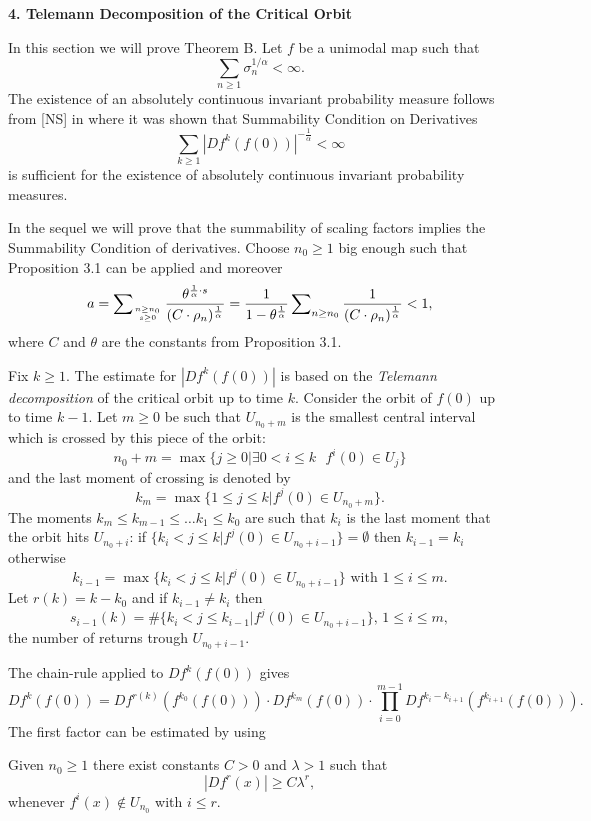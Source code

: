 \bigskip
\centerline{\bf 4. Telemann Decomposition of the Critical Orbit}
\bigskip

\flushpar
In this section we will prove Theorem B. Let $f$ be a unimodal
map such that 
$$
\sum_{n\ge 1} \sigma_n^{1/\alpha}<\infty.
$$
The existence of an absolutely continuous invariant probability
measure follows from [NS] in where it was shown that  Summability 
Condition on Derivatives
$$
\sum_{k\ge 1}|Df^k(f(0))|^{-\frac1\alpha}<\infty
$$
is 
sufficient for the existence of absolutely continuous invariant 
probability measures.

\flushpar
In the sequel we will prove that the summability of scaling factors
implies the Summability Condition of derivatives. 
Choose $n_0\ge 1$ big enough such that Proposition 3.1 can be applied
and moreover
$$
a=\sum_{{n\ge n_0} \atop {s\ge 0}}\frac{\theta^{\frac1\alpha\cdot s}}
                                     {(C\cdot\rho_n)^{\frac{1}{\alpha}}}= 
\frac{1}{1-\theta^{\frac1\alpha}} \sum_{n\ge n_0} 
\frac{1}{(C\cdot \rho_n)^\frac1\alpha}< 1,
$$
where $C$ and $\theta$ are the constants from Proposition 3.1.

\flushpar
Fix $k\ge 1$. The estimate for $|Df^k(f(0))|$ is based on the {\it Telemann 
decomposition} of the critical orbit up to time $k$. Consider the 
orbit of $f(0)$ up to time $k-1$. Let $m\ge 0$
be such that $U_{n_0+m}$ is the smallest central interval
which is crossed by this piece of the orbit:
$$
n_0+m=\max\{j\ge 0| \exists 0<i\le k \text{  }f^i(0)\in U_j\}
$$
and the last moment of crossing is denoted by
$$
k_m=\max\{1\le j\le k| f^j(0)\in U_{n_0+m}\}.
$$
The moments $k_m\le k_{m-1}\le \dots k_1\le k_0$ are such that $k_i$
is the last moment that the orbit hits $U_{n_0+i}$:
if $\{k_i<j\le k|f^j(0)\in U_{n_0+i-1}\}=\emptyset$ then $k_{i-1}=k_i$
otherwise
$$
k_{i-1}=\max\{k_i<j\le k|f^j(0)\in U_{n_0+i-1}\} \text{ with } 1\le i\le m.
$$
Let $r(k)=k-k_0$ and if $k_{i-1}\ne k_i$ then
$$
s_{i-1}(k)=\#\{k_i<j\le k_{i-1}|f^j(0)\in U_{n_0+i-1}\} \text{,  } 
1\le i\le m,
$$
the number of returns trough $U_{n_0+i-1}$.

\bigskip

\flushpar
The chain-rule applied to $Df^k(f(0))$ gives
$$
Df^k(f(0))=Df^{r(k)}(f^{k_0}(f(0)))\cdot
Df^{k_m}(f(0))\cdot
\prod_{i=0}^{m-1} Df^{k_i-k_{i+1}}(f^{k_{i+1}}(f(0))).
$$
The first factor can be estimated by using 

 Given $n_0\ge 1$ 
there exist constants $C>0$ and 
$\lambda>1$ such that 
$$
|Df^r(x)|\ge C\lambda^r,
$$
whenever $f^i(x)\notin U_{n_0}$ with $i\le r$.
\endproclaim

